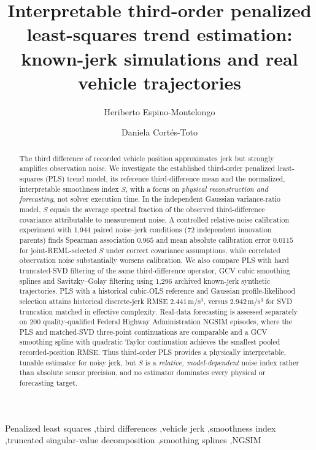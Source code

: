 \documentclass[a4paper,fleqn]{cas-dc}
\begin{document}
\let\WriteBookmarks\relax
\def\floatpagepagefraction{1}
\def\textpagefraction{.001}
\title[mode=title]{Interpretable third-order penalized least-squares trend estimation: known-jerk simulations and real vehicle trajectories}
\author[1]{Heriberto Espino-Montelongo}
\author[1]{Daniela Cort\'es-Toto}
\begin{abstract}
The third difference of recorded vehicle position approximates jerk but strongly amplifies observation noise. We investigate the established third-order penalized least-squares (PLS) trend model, its reference third-difference mean and the normalized, interpretable smoothness index $S$, with a focus on \emph{physical reconstruction and forecasting}, not solver execution time. In the independent Gaussian variance-ratio model, $S$ equals the average spectral fraction of the observed third-difference covariance attributable to measurement noise. A controlled relative-noise calibration experiment with 1,944 paired noise--jerk conditions (72 independent innovation parents) finds Spearman association $0.965$ and mean absolute calibration error $0.0115$ for joint-REML-selected $S$ under correct covariance assumptions, while correlated observation noise substantially worsens calibration. We also compare PLS with hard truncated-SVD filtering of the same third-difference operator, GCV cubic smoothing splines and Savitzky--Golay filtering using 1,296 archived known-jerk synthetic trajectories. PLS with a historical cubic-OLS reference and Gaussian profile-likelihood selection attains historical discrete-jerk RMSE $2.441$\,m/s$^3$, versus $2.942$\,m/s$^3$ for SVD truncation matched in effective complexity. Real-data forecasting is assessed separately on 200 quality-qualified Federal Highway Administration NGSIM episodes, where the PLS and matched-SVD three-point continuations are comparable and a GCV smoothing spline with quadratic Taylor continuation achieves the smallest pooled recorded-position RMSE. Thus third-order PLS provides a physically interpretable, tunable estimator for noisy jerk, but $S$ is a \emph{relative, model-dependent} noise index rather than absolute sensor precision, and no estimator dominates every physical or forecasting target.
\end{abstract}
\begin{keywords}
Penalized least squares \sep third differences \sep vehicle jerk \sep smoothness index \sep truncated singular-value decomposition \sep smoothing splines \sep NGSIM
\end{keywords}
\maketitle








\end{document}
